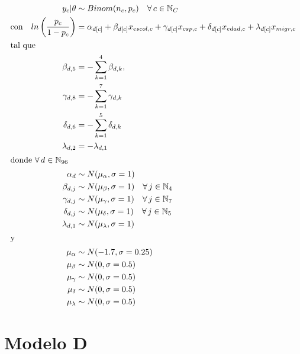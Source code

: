 \begin{align}\label{eq:Modelo_Comp_C}
y_c|\theta & \sim Binom(n_c,p_c) \quad \forall \, c \in \mathbb{N}_C \nonumber \\
\text{con} \quad ln\left(\dfrac{p_c}{1-p_c}\right) &= \alpha_{d[c]} + \beta_{d[c]} x_{escol,c} + \gamma_{d[c]} x_{csp,c} + \delta_{d[c]} x_{edad,c} + \lambda_{d[c]} x_{migr,c} \\ 
\intertext{tal que} 
\beta_{d,5} &= -\sum\limits_{k = 1}^{4} \beta_{d,k}, \nonumber \\
\gamma_{d,8} &= -\sum\limits_{k = 1}^{7} \gamma_{d,k} \nonumber \\
\delta_{d,6} &= -\sum\limits_{k = 1}^{5} \delta_{d,k} \nonumber \\
\lambda_{d,2} &= -\lambda_{d,1} \nonumber \\
\intertext{donde $\forall \, d \in \mathbb{N}_{96}$}
\alpha_d & \sim N(\mu_{\alpha}, \sigma=1) \quad  \nonumber \\
\beta_{d,j} & \sim N(\mu_{\beta}, \sigma=1) \quad \forall \, j \in \mathbb{N}_{4} \nonumber \\
\gamma_{d,j} & \sim N(\mu_{\gamma}, \sigma=1) \quad \forall \, j \in \mathbb{N}_{7} \nonumber \\
\delta_{d,j} & \sim N(\mu_{\delta}, \sigma=1) \quad \forall \, j \in \mathbb{N}_{5} \nonumber \\
\lambda_{d,1} & \sim N(\mu_{\lambda}, \sigma=1) \nonumber \\
\intertext{y}
\mu_{\alpha} &\sim N(-1.7,\sigma=0.25) \nonumber \\
\mu_{\beta} &\sim N(0,\sigma=0.5) \nonumber \\
\mu_{\gamma} &\sim N(0,\sigma=0.5) \nonumber \\
\mu_{\delta} &\sim N(0,\sigma=0.5) \nonumber \\
\mu_{\lambda} &\sim N(0,\sigma=0.5) \nonumber
\end{align}

\section{Modelo D}

